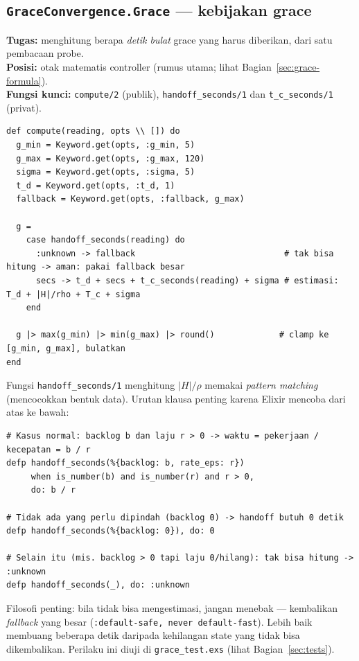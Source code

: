 \documentclass[11pt]{article}
\newcommand{\code}[1]{\texttt{\small #1}}
\begin{document}
\subsection{\texttt{GraceConvergence.Grace} --- kebijakan grace}
\textbf{Tugas:} menghitung berapa \emph{detik bulat} grace yang harus diberikan, dari satu pembacaan
probe. \\
\textbf{Posisi:} otak matematis controller (rumus utama; lihat Bagian~\ref{sec:grace-formula}). \\
\textbf{Fungsi kunci:} \code{compute/2} (publik), \code{handoff\_seconds/1} dan \code{t\_c\_seconds/1}
(privat).
\begin{lstlisting}[style=ex]
def compute(reading, opts \\ []) do
  g_min = Keyword.get(opts, :g_min, 5)
  g_max = Keyword.get(opts, :g_max, 120)
  sigma = Keyword.get(opts, :sigma, 5)
  t_d = Keyword.get(opts, :t_d, 1)
  fallback = Keyword.get(opts, :fallback, g_max)

  g =
    case handoff_seconds(reading) do
      :unknown -> fallback                              # tak bisa hitung -> aman: pakai fallback besar
      secs -> t_d + secs + t_c_seconds(reading) + sigma # estimasi: T_d + |H|/rho + T_c + sigma
    end

  g |> max(g_min) |> min(g_max) |> round()             # clamp ke [g_min, g_max], bulatkan
end
\end{lstlisting}
Fungsi \code{handoff\_seconds/1} menghitung $|H|/\rho$ memakai \emph{pattern matching} (mencocokkan
bentuk data). Urutan klausa penting karena Elixir mencoba dari atas ke bawah:
\begin{lstlisting}[style=ex]
# Kasus normal: backlog b dan laju r > 0 -> waktu = pekerjaan / kecepatan = b / r
defp handoff_seconds(%{backlog: b, rate_eps: r})
     when is_number(b) and is_number(r) and r > 0,
     do: b / r

# Tidak ada yang perlu dipindah (backlog 0) -> handoff butuh 0 detik
defp handoff_seconds(%{backlog: 0}), do: 0

# Selain itu (mis. backlog > 0 tapi laju 0/hilang): tak bisa hitung -> :unknown
defp handoff_seconds(_), do: :unknown
\end{lstlisting}
Filosofi penting: bila tidak bisa mengestimasi, jangan menebak --- kembalikan \emph{fallback} yang
besar (\code{:default-safe, never default-fast}). Lebih baik membuang beberapa detik daripada
kehilangan state yang tidak bisa dikembalikan. Perilaku ini diuji di \code{grace\_test.exs} (lihat
Bagian~\ref{sec:tests}).
\end{document}
